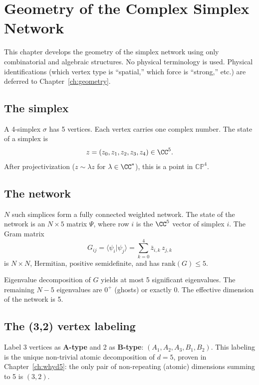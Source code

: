 \section{Geometry of the Complex Simplex Network}
\label{ch:simplex_geometry}

This chapter develops the geometry of the simplex network using only combinatorial and algebraic structures. No physical terminology is used. Physical identifications (which vertex type is ``spatial,'' which force is ``strong,'' etc.) are deferred to Chapter~\ref{ch:geometry}.

\subsection{The simplex}

A 4-simplex $\sigma$ has 5 vertices. Each vertex carries one complex number. The state of a simplex is
\begin{equation}
z = (z_0, z_1, z_2, z_3, z_4) \in \CC^5.
\end{equation}
After projectivization ($z \sim \lambda z$ for $\lambda \in \CC^*$), this is a point in $\mathbb{CP}^4$.

\subsection{The network}

$N$ such simplices form a fully connected weighted network. The state of the network is an $N \times 5$ matrix $\Psi$, where row $i$ is the $\CC^5$ vector of simplex $i$. The Gram matrix
\begin{equation}
G_{ij} = \langle\psi_i|\psi_j\rangle = \sum_{k=0}^{4} \bar{z}_{i,k}\, z_{j,k}
\end{equation}
is $N \times N$, Hermitian, positive semidefinite, and has $\text{rank}(G) \leq 5$.

Eigenvalue decomposition of $G$ yields at most 5 significant eigenvalues. The remaining $N - 5$ eigenvalues are $0^+$ (ghosts) or exactly 0. The effective dimension of the network is 5.

\subsection{The (3,2) vertex labeling}

Label 3 vertices as \textbf{A-type} and 2 as \textbf{B-type}: $(A_1, A_2, A_3, B_1, B_2)$. This labeling is the unique non-trivial atomic decomposition of $d = 5$, proven in Chapter~\ref{ch:whyd5}: the only pair of non-repeating (atomic) dimensions summing to 5 is $(3, 2)$.


